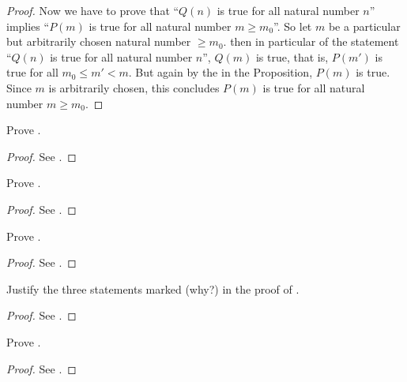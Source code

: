 \begin{proof}
Now we have to prove that ``\(Q(n)\) is true for all natural number \(n\)'' implies ``\(P(m)\) is true for all natural number \(m \geq m_0\)''. So let \(m\) be a particular but arbitrarily chosen natural number \(\geq m_0\). then in particular of the statement ``\(Q(n)\) is true for all natural number \(n\)'', \(Q(m)\) is true, that is, \(P(m')\) is true for all \(m_0 \leq m' < m\). But again by the  in the Proposition, \(P(m)\) is true. Since \(m\) is arbitrarily chosen, this concludes \(P(m)\) is true for all natural number \(m \geq m_0\).
\end{proof}

\exercisesection

\begin{exercise}\label{exercise 2.2.1}
    Prove .
\end{exercise}
\begin{proof}
    See .
\end{proof}

\begin{exercise}\label{exercise 2.2.2}
    Prove .
\end{exercise}
\begin{proof}
    See .
\end{proof}

\begin{exercise}\label{exercise 2.2.3}
    Prove .
\end{exercise}
\begin{proof}
    See .
\end{proof}

\begin{exercise}\label{exercise 2.2.4}
    Justify the three statements marked (why?) in the proof of .
\end{exercise}
\begin{proof}
    See .
\end{proof}

\begin{exercise}\label{exercise 2.2.5}
    Prove .
\end{exercise}
\begin{proof}
    See .
\end{proof}

